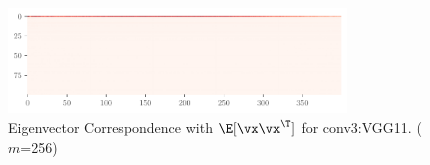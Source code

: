 \begin{figure}[H]
    \centering
    \captionsetup{justification=centering}
    \includegraphics[width=0.8\textwidth]{Appendix_Figures/Correspondance/xxT_Truexxt_corr_expand_t400_CIFAR10_Exp1_VGG11_nobn_fixlr0.01_E-1_features.6.pdf}

    \caption{Eigenvector Correspondence with $\E[\vx\vx^\T]$ for conv3:VGG11. ($m$=256)}
    \label{fig:Corr_VGG_conv2}
\end{figure}